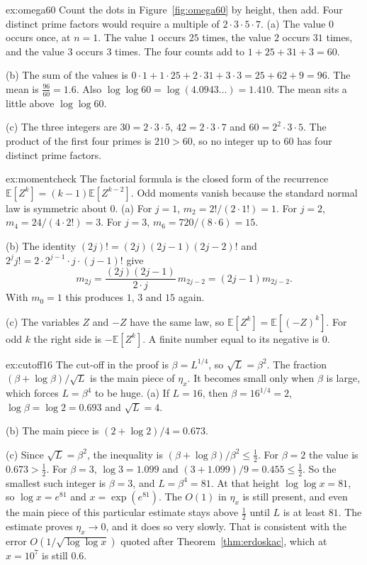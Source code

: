 \begin{solution}{ex:omega60}
\idea Count the dots in Figure~\ref{fig:omega60} by height, then add. Four distinct prime factors would require a multiple of $2\cdot3\cdot5\cdot7$.
\writeup (a) The value $0$ occurs once, at $n=1$. The value $1$ occurs $25$ times, the value $2$ occurs $31$ times, and the value $3$ occurs $3$ times. The four counts add to $1+25+31+3=60$.

(b) The sum of the values is $0\cdot1+1\cdot25+2\cdot31+3\cdot3=25+62+9=96$. The mean is $\frac{96}{60}=1.6$. Also $\log\log 60=\log(4.0943\ldots)=1.410$. The mean sits a little above $\log\log 60$.

(c) The three integers are $30=2\cdot3\cdot5$, $42=2\cdot3\cdot7$ and $60=2^2\cdot3\cdot5$. The product of the first four primes is $210>60$, so no integer up to $60$ has four distinct prime factors.
\end{solution}

\begin{solution}{ex:momentcheck}
\idea The factorial formula is the closed form of the recurrence $\mathbb E[Z^k]=(k-1)\mathbb E[Z^{k-2}]$. Odd moments vanish because the standard normal law is symmetric about $0$.
\writeup (a) For $j=1$, $m_2=2!/(2\cdot1!)=1$. For $j=2$, $m_4=24/(4\cdot2!)=3$. For $j=3$, $m_6=720/(8\cdot6)=15$.

(b) The identity $(2j)!=(2j)(2j-1)(2j-2)!$ and $2^j j!=2\cdot 2^{j-1}\cdot j\cdot(j-1)!$ give
\[
m_{2j}=\frac{(2j)(2j-1)}{2\cdot j}\,m_{2j-2}=(2j-1)m_{2j-2}.
\]
With $m_0=1$ this produces $1$, $3$ and $15$ again.

(c) The variables $Z$ and $-Z$ have the same law, so $\mathbb E[Z^k]=\mathbb E[(-Z)^k]$. For odd $k$ the right side is $-\mathbb E[Z^k]$. A finite number equal to its negative is $0$.
\end{solution}

\begin{solution}{ex:cutoff16}
\idea The cut-off in the proof is $\beta=L^{1/4}$, so $\sqrt L=\beta^2$. The fraction $(\beta+\log\beta)/\sqrt L$ is the main piece of $\eta_x$. It becomes small only when $\beta$ is large, which forces $L=\beta^4$ to be huge.
\writeup (a) If $L=16$, then $\beta=16^{1/4}=2$, $\log\beta=\log2=0.693$ and $\sqrt L=4$.

(b) The main piece is $(2+\log2)/4=0.673$.

(c) Since $\sqrt L=\beta^2$, the inequality is $(\beta+\log\beta)/\beta^2\le\frac12$. For $\beta=2$ the value is $0.673>\frac12$. For $\beta=3$, $\log3=1.099$ and $(3+1.099)/9=0.455\le\frac12$. So the smallest such integer is $\beta=3$, and $L=\beta^4=81$. At that height $\log\log x=81$, so $\log x=e^{81}$ and $x=\exp(e^{81})$. The $O(1)$ in $\eta_x$ is still present, and even the main piece of this particular estimate stays above $\frac12$ until $L$ is at least $81$. The estimate proves $\eta_x\to0$, and it does so very slowly. That is consistent with the error $O(1/\sqrt{\log\log x})$ quoted after Theorem~\ref{thm:erdoskac}, which at $x=10^7$ is still $0.6$.
\end{solution}

